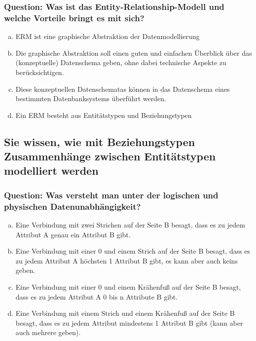 \documentclass{article}
\begin{document}
\begin{adjustwidth}{2em}{2em}
\begin{adjustwidth}{2em}{2em}
\begin{adjustwidth}{1em}{}
				\subsubsection*{Question: Was ist das Entity-Relationship-Modell und welche Vorteile bringt es mit sich?}
				\begin{adjustwidth}{1em}{}
					\begin{enumerate}[(a)]
						\item ERM ist eine graphische Abstraktion der Datenmodellierung
						\item Die graphische Abstraktion soll einen guten und einfachen Überblick über das (konzeptuelle) Datenschema geben, ohne dabei technische Aspekte zu berücksichtigen.
						\item Diese konzeptuellen Datenschematas können in das Datenschema eines bestimmten Datenbanksystems überführt werden.
						\item Ein ERM besteht aus Entitätstypen und Beziehungstypen
					\end{enumerate}
				\end{adjustwidth}
			\end{adjustwidth}
			\subsection{Sie wissen, wie mit Beziehungstypen Zusammenhänge zwischen Entitätstypen modelliert werden}
			\begin{adjustwidth}{1em}{}
				\subsubsection*{Question: Was versteht man unter der logischen und physischen Datenunabhängigkeit?}
				\begin{adjustwidth}{1em}{}
					\begin{enumerate}[(a)]
						\item Eine Verbindung mit zwei Strichen auf der Seite B besagt, dass es zu jedem Attribut A genau ein Attribut B gibt.
						\item Eine Verbindung mit einer 0 und einem Strich auf der Seite B besagt, dass es zu jedem Attribut A höchsten 1 Attribut B gibt, es kann aber auch keins geben.
						\item Eine Verbindung mit einer 0 und einem Krähenfuß auf der Seite B besagt, dass es zu jedem Attribut A 0 bis n Attribute B gibt.
						\item Eine Verbindung mit einem Strich und einem Krähenfuß auf der Seite B besagt, dass es zu jedem Attribut mindestens 1 Attribut B gibt (kann aber auch mehrere geben).
					\end{enumerate}
				\end{adjustwidth}
			\end{adjustwidth}

\end{adjustwidth}
\end{adjustwidth}
\end{document}
